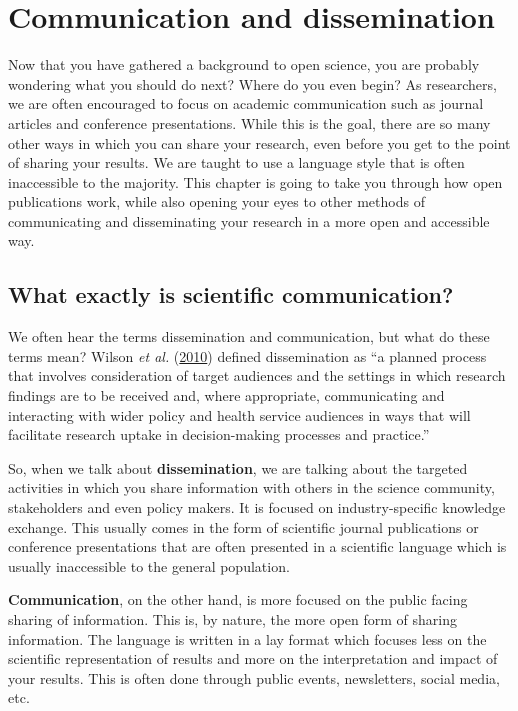 \documentclass[
]{book}
\begin{document}
\hypertarget{communication-and-dissemination}{%
\chapter{Communication and dissemination}\label{communication-and-dissemination}}

Now that you have gathered a background to open science, you are probably wondering what you should do next? Where do you even begin? As researchers, we are often encouraged to focus on academic communication such as journal articles and conference presentations. While this is the goal, there are so many other ways in which you can share your research, even before you get to the point of sharing your results. We are taught to use a language style that is often inaccessible to the majority. This chapter is going to take you through how open publications work, while also opening your eyes to other methods of communicating and disseminating your research in a more open and accessible way.

\hypertarget{what-exactly-is-scientific-communication}{%
\section{What exactly is scientific communication?}\label{what-exactly-is-scientific-communication}}

We often hear the terms dissemination and communication, but what do these terms mean? Wilson \emph{et al.} (\href{https://www.ncbi.nlm.nih.gov/pmc/articles/PMC2994786/}{2010}) defined dissemination as ``a planned process that involves consideration of target audiences and the settings in which research findings are to be received and, where appropriate, communicating and interacting with wider policy and health service audiences in ways that will facilitate research uptake in decision-making processes and practice.''

So, when we talk about \textbf{dissemination}, we are talking about the targeted activities in which you share information with others in the science community, stakeholders and even policy makers. It is focused on industry-specific knowledge exchange. This usually comes in the form of scientific journal publications or conference presentations that are often presented in a scientific language which is usually inaccessible to the general population.

\textbf{Communication}, on the other hand, is more focused on the public facing sharing of information. This is, by nature, the more open form of sharing information. The language is written in a lay format which focuses less on the scientific representation of results and more on the interpretation and impact of your results. This is often done through public events, newsletters, social media, etc.
\end{document}
